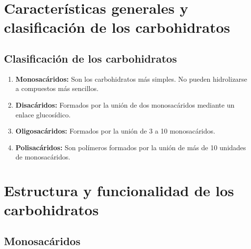 
\section{Características generales y clasificación de los carbohidratos}



\subsection{Clasificación de los carbohidratos}

\begin{enumerate}
    \item \textbf{Monosacáridos:} Son los carbohidratos más simples. No pueden hidrolizarse a compuestos más sencillos.
    \item \textbf{Disacáridos:} Formados por la unión de dos monosacáridos mediante un enlace glucosídico.
    \item \textbf{Oligosacáridos:} Formados por la unión de 3 a 10 monosacáridos.
    \item \textbf{Polisacáridos:} Son polímeros formados por la unión de más de 10 unidades de monosacáridos.
\end{enumerate}

\section{Estructura y funcionalidad de los carbohidratos}

\subsection{Monosacáridos}

